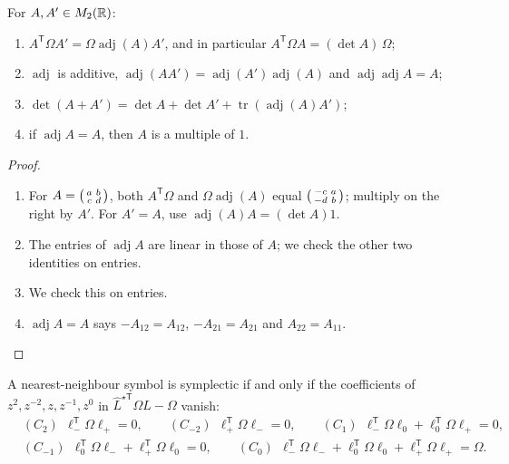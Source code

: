 \begin{lemma}\label{lem:qca-2x2}
For $A,A'\in M_2(\mathbb R)$:
\begin{enumerate}[label=(\alph*)]
\item $A^{\mathsf T}\Omega A'=\Omega\operatorname{adj}(A)A'$, and in particular
$A^{\mathsf T}\Omega A=(\det A)\,\Omega$;
\item $\operatorname{adj}$ is additive, $\operatorname{adj}(AA')=\operatorname{adj}(A')\operatorname{adj}(A)$ and
$\operatorname{adj}\operatorname{adj}A=A$;
\item $\det(A+A')=\det A+\det A'+\operatorname{tr}(\operatorname{adj}(A)A')$;
\item if $\operatorname{adj}A=A$, then $A$ is a multiple of $1$.
\end{enumerate}
\end{lemma}

\begin{proof}\leavevmode
\begin{enumerate}[label=(\alph*)]
\item For $A=\begin{psmallmatrix}a&b\\c&d\end{psmallmatrix}$, both $A^{\mathsf T}\Omega$ and
$\Omega\operatorname{adj}(A)$ equal $\begin{psmallmatrix}-c&a\\-d&b\end{psmallmatrix}$; multiply on the
right by $A'$. For $A'=A$, use $\operatorname{adj}(A)A=(\det A)1$.
\item The entries of $\operatorname{adj}A$ are linear in those of $A$; we check the other two identities
on entries.
\item We check this on entries.
\item $\operatorname{adj}A=A$ says $-A_{12}=A_{12}$, $-A_{21}=A_{21}$ and $A_{22}=A_{11}$.
\end{enumerate}
\end{proof}

\noindent{}

\begin{proposition}\label{prop:qca-C}
A nearest-neighbour symbol is symplectic if and only if the coefficients of $z^{2},z^{-2},z,
z^{-1},z^0$ in $\hat L^{\star\mathsf T}\Omega\hat L-\Omega$ vanish:
\begin{align*}
&(C_2)\ \ \ell_-^{\mathsf T}\Omega\ell_+=0,\qquad (C_{-2})\ \ \ell_+^{\mathsf T}\Omega\ell_-=0,\qquad
(C_1)\ \ \ell_-^{\mathsf T}\Omega\ell_0+\ell_0^{\mathsf T}\Omega\ell_+=0,\\
&(C_{-1})\ \ \ell_0^{\mathsf T}\Omega\ell_-+\ell_+^{\mathsf T}\Omega\ell_0=0,\qquad
(C_0)\ \ \ell_-^{\mathsf T}\Omega\ell_-+\ell_0^{\mathsf T}\Omega\ell_0+\ell_+^{\mathsf T}\Omega\ell_+=\Omega.
\end{align*}
\end{proposition}

